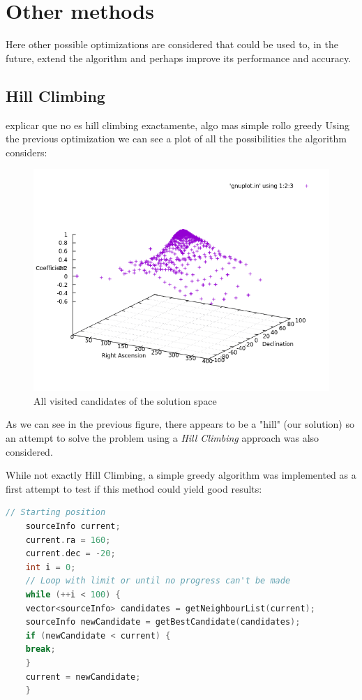 \chapter{Other methods}

Here other possible optimizations are considered that could be used to, in the future, extend the algorithm and perhaps improve its performance and accuracy.

\section{Hill Climbing}

explicar que no es hill climbing exactamente, algo mas simple rollo greedy 
Using the previous optimization we can see a plot of all the possibilities the algorithm considers:

\begin{figure}[!htb]
	\begin{centering}
		\includegraphics[width=0.5\linewidth]{images/ch6/hillClimbing/resultsAll.png}
		\caption{All visited candidates of the solution space}
		\label{fig:solutionSpace}
	\end{centering}
\end{figure}

As we can see in the previous figure, there appears to be a "hill" (our solution) so an attempt to solve the problem using a \textit{Hill Climbing} approach was also considered.

While not exactly Hill Climbing, a simple greedy algorithm was implemented as a first attempt to test if this method could yield good results:

\begin{minipage}{\linewidth}
	\begin{lstlisting}[language=c, caption=Hill Climbing]
	// Starting position
	sourceInfo current;
	current.ra = 160;
	current.dec = -20;
	int i = 0;
	// Loop with limit or until no progress can't be made
	while (++i < 100) {
	vector<sourceInfo> candidates = getNeighbourList(current);
	sourceInfo newCandidate = getBestCandidate(candidates);
	if (newCandidate < current) {
	break;
	}
	current = newCandidate;
	}
	\end{lstlisting}
\end{minipage}

